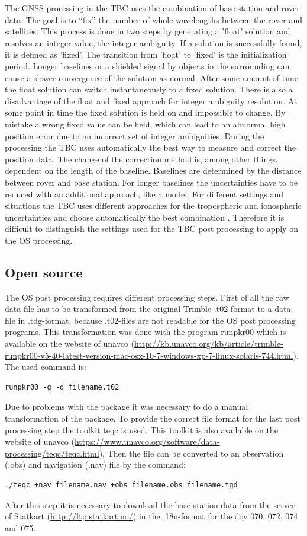 The GNSS processing in the TBC uses the combination of base station and rover data.
The goal is to “fix” the number of whole wavelengths between the rover and satellites.
This process is done in two steps by generating a 'float' solution and resolves an integer value, the integer ambiguity. 
If a solution is successfully found, it is defined as 'fixed'.
The transition from 'float' to 'fixed' is the initialization period.
Longer baselines or a shielded signal by objects in the surrounding can cause a slower convergence of the solution as normal.
After some amount of time the float solution can switch instantaneously to a fixed solution.
There is also a disadvantage of the float and fixed approach for integer ambiguity resolution.
At some point in time the fixed solution is held on and impossible to change.
By mistake a wrong fixed value can be held, which can lead to an abnormal high position error due to an incorrect set of integer ambiguities.
During the processing the TBC uses automatically the best way to measure and correct the position data. 
The change of the correction method is, among other things, dependent on the length of the baseline.
Baselines are determined by the distance between rover and base station.
For longer baselines the uncertainties have to be reduced with an additional approach, like a model.
For different settings and situations the TBC uses different approaches for the tropospheric and ionospheric uncertainties and choose automatically the best combination \citep{Trprocess}.
Therefore it is difficult to distinguish the settings used for the TBC post processing to apply on the OS processing.

\subsection{Open source}

The OS post processing requires different processing steps.
First of all the raw data file has to be transformed from the original Trimble .t02-format to a data file in .tdg-format, because .t02-files are not readable for the OS post processing programs.
This transformation was done with the program runpkr00 which is available on the website of unavco (\url{http://kb.unavco.org/kb/article/trimble-runpkr00-v5-40-latest-version-mac-osx-10-7-windows-xp-7-linux-solaris-744.html}).
The used command is: 
\begin{verbatim} 
runpkr00 -g -d filename.t02 
\end{verbatim}
Due to problems with the package it was necessary to do a manual transformation of the package.
To provide the correct file format for the last post processing step the toolkit teqc is used.
This toolkit is also available on the website of unavco (\url{https://www.unavco.org/software/data-processing/teqc/teqc.html}).
Then the file can be converted to an observation (.obs) and navigation (.nav) file by the command:
\begin{verbatim}
./teqc +nav filename.nav +obs filename.obs filename.tgd
\end{verbatim}
After this step it is necessary to download the base station data from the server of Statkart (\url{http://ftp.statkart.no/}) in the .18n-format for the doy 070, 072, 074 and 075.
\medskip

